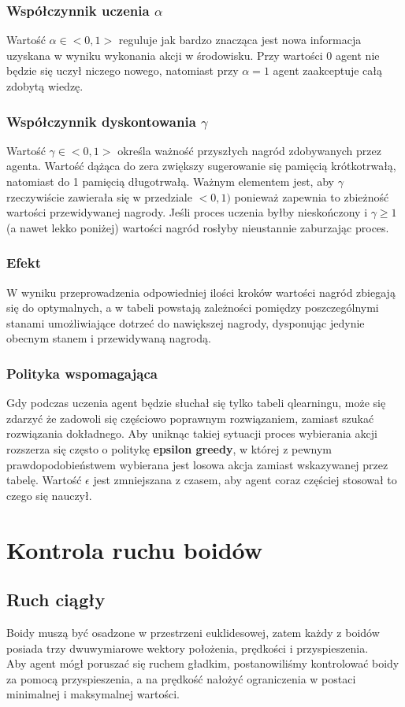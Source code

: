\documentclass{article}
\begin{document}
\subsubsection{Współczynnik uczenia \(\alpha\)}
Wartość \(\alpha \in <0, 1>\) reguluje jak bardzo znacząca jest nowa informacja uzyskana w wyniku wykonania akcji w środowisku. Przy wartości 0 agent nie będzie się uczył niczego nowego, natomiast przy \(\alpha = 1\) agent zaakceptuje całą zdobytą wiedzę. 
\subsubsection{Współczynnik dyskontowania \(\gamma\)}
Wartość \(\gamma \in <0, 1>\) określa ważność przyszłych nagród zdobywanych przez agenta. Wartość dążąca do zera zwiększy sugerowanie się pamięcią krótkotrwałą, natomiast do 1 pamięcią długotrwałą. Ważnym elementem jest, aby \(\gamma\) rzeczywiście zawierała się w przedziale \(<0, 1)\) ponieważ zapewnia to zbieżność wartości przewidywanej nagrody. Jeśli proces uczenia byłby nieskończony i \(\gamma \ge 1\) (a nawet lekko poniżej) wartości nagród rosłyby nieustannie zaburzając proces.
\subsubsection{Efekt}
W wyniku przeprowadzenia odpowiedniej ilości kroków wartości nagród zbiegają się do optymalnych, a w tabeli powstają zależności pomiędzy poszczególnymi stanami umożliwiające dotrzeć do nawiększej nagrody, dysponując jedynie obecnym stanem i przewidywaną nagrodą.
\subsubsection{Polityka wspomagająca}
Gdy podczas uczenia agent będzie słuchał się tylko tabeli qlearningu, może się zdarzyć że zadowoli się częściowo poprawnym rozwiązaniem, zamiast szukać rozwiązania dokładnego. Aby uniknąc takiej sytuacji proces wybierania akcji rozszerza się często o politykę \textbf{epsilon greedy}, w której z pewnym prawdopodobieństwem wybierana jest losowa akcja zamiast wskazywanej przez tabelę. Wartość \(\epsilon\) jest zmniejszana z czasem, aby agent coraz częściej stosował to czego się nauczył.

\section{Kontrola ruchu boidów}
\subsection{Ruch ciągły}
Boidy muszą być osadzone w przestrzeni euklidesowej, zatem każdy z boidów posiada trzy dwuwymiarowe wektory położenia, prędkości i przyspieszenia.\\
Aby agent mógł poruszać się ruchem gładkim, postanowiliśmy kontrolować boidy za pomocą przyspieszenia, a na prędkość nałożyć ograniczenia w postaci minimalnej i maksymalnej wartości.
\end{document}
